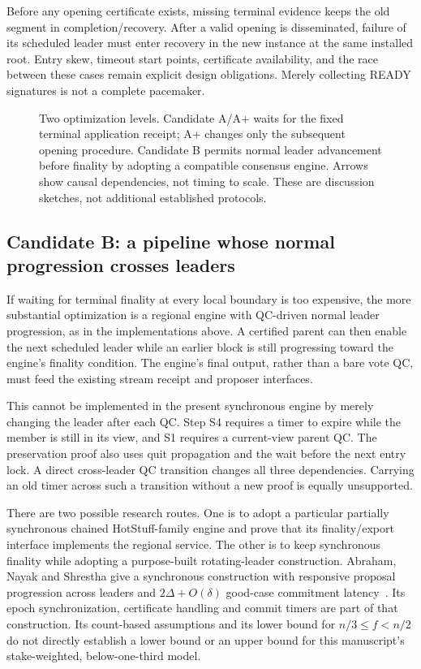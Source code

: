 Before any opening certificate exists, missing terminal evidence keeps the
old segment in completion/recovery. After a valid opening is disseminated,
failure of its scheduled leader must enter recovery in the new instance at
the same installed root. Entry skew, timeout start points, certificate
availability, and the race between these cases remain explicit design
obligations. Merely collecting READY signatures is not a complete pacemaker.

\begin{figure}[htbp]\centering

\caption{Two optimization levels. Candidate A/A+ waits for the fixed terminal
application receipt; A+ changes only the subsequent opening procedure.
Candidate B permits normal leader advancement before finality by adopting
a compatible consensus engine. Arrows show causal dependencies, not timing
to scale. These are discussion sketches, not additional established protocols.}
\label{fig:local-rotation-options}
\end{figure}

\subsection{Candidate B: a pipeline whose normal progression crosses leaders}
\label{sec:qc-rotation-design}
If waiting for terminal finality at every local boundary is too expensive,
the more substantial optimization is a regional engine with QC-driven
normal leader progression, as in the implementations above. A certified
parent can then enable the next scheduled leader while an earlier block is
still progressing toward the engine's finality condition. The engine's
final output, rather than a bare vote QC, must feed the existing stream
receipt and proposer interfaces.

This cannot be implemented in the present synchronous engine by merely
changing the leader after each QC. Step S4 requires a timer to expire while
the member is still in its view, and S1 requires a current-view parent QC.
The preservation proof also uses quit propagation and the wait before the
next entry lock. A direct cross-leader QC transition changes all three
dependencies. Carrying an old timer across such a transition without a new
proof is equally unsupported.

There are two possible research routes. One is to adopt a particular
partially synchronous chained HotStuff-family engine and prove that its
finality/export interface implements the regional service. The other is
to keep synchronous finality while adopting a purpose-built rotating-leader
construction. Abraham, Nayak and Shrestha give a synchronous construction
with responsive proposal progression across leaders and $2\Delta+O(\delta)$
good-case commitment latency~\cite{rotatingsync}. Its epoch synchronization,
certificate handling and commit timers are part of that construction.
Its count-based assumptions and its lower bound for
$n/3\leq f<n/2$ do not directly establish a lower bound or an upper bound
for this manuscript's stake-weighted, below-one-third model.

